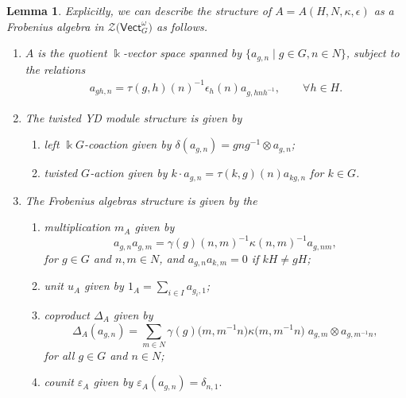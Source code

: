 \documentclass[pdftex]{sigma}
\numberwithin{equation}{section}
\newtheorem{Lemma}[Theorem]{Lemma}
\newcommand{\Vect}{\mathsf{Vect}}
\newcommand{\cZ}{\mathcal{Z}}
\begin{document}
\begin{Lemma}\label{lem:AFrobenius}
 Explicitly, we can describe the structure of $A=A(H,N,\kappa,\epsilon)$ as a Frobenius algebra in $\cZ\big(\Vect_G^\omega\big)$ as follows.
\begin{enumerate}\itemsep=0pt
 \item[$(a)$] $A$ is the quotient $\Bbbk$-vector space spanned by $\{ a_{g,n} \mid g \in G, n\in N\}$, subject to the relations
 \begin{align}
 a_{gh,n}=\tau(g,h)(n)^{-1}\epsilon_h(n)a_{g,hnh^{-1}}, \qquad \forall h\in H.\label{eq:Davquotrel}
\end{align}
\item[$(b)$] The twisted YD module structure is given by
 \begin{enumerate}\itemsep=0pt
 \item[$(i)$] left $\Bbbk G$-coaction given by $\delta(a_{g,n})=g ng^{-1}\otimes a_{g,n}$;
 \item[$(ii)$] twisted $G$-action given by $k\cdot a_{g,n}=\tau(k,g)(n)a_{kg,n}$ for $k\in G$.
 \end{enumerate}
\item[$(c)$] The Frobenius algebras structure is given by the
 \begin{enumerate}
 \item[$(iii)$] multiplication $m_A$ given by \[a_{g,n}a_{g,m}=\gamma(g)(n,m)^{-1}\kappa(n,m)^{-1}a_{g,nm},
 \] for $g\in G$ and $n,m\in N$, and $a_{g,n}a_{k,m}=0$ if $kH\neq gH$;
 \item[$(iv)$] unit $u_A$ given by $1_A =\sum\limits_{i\in I}a_{g_i,1}$;
 \item[$(v)$] coproduct $\Delta_A$ given by
 \[\Delta_A(a_{g,n}) = \sum_{m\in N}\gamma(g)\big(m,m^{-1}n\big)\kappa\big(m,m^{-1}n\big) \;a_{g,m}\otimes a_{g,m^{-1}n},\]
 for all $g\in G$ and $n\in N$;
 \item[$(vi)$] counit $\varepsilon_A$ given by
 $\varepsilon_A(a_{g,n}) = \delta_{n,1}.$
 \end{enumerate}
\end{enumerate}
\end{Lemma}
\end{document}
